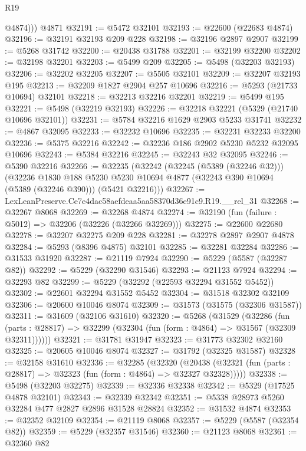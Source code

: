 \begin{lexlean}{R19}
\begin{coremodule}
          @4874)))
    @4871
@32191 := @5472 @32101
@32193 := @22600 (@22683 @4874)
@32196 := @32191 @32193 @209 @228
@32198 := @32196 @2897 @2907
@32199 := @5268 @31742
@32200 := @20438 @31788
@32201 := @32199 @32200
@32202 := @32198 @32201
@32203 := @5499 @209
@32205 := @5498 (@32203 @32193)
@32206 := @32202 @32205
@32207 := @5505 @32101
@32209 := @32207 @32193 @195
@32213 := @32209 @1827 @2904 @257 @10696
@32216 := @5293 (@21733 @10694) @32101
@32218 := @32213 @32216 @32201
@32219 := @5499 @195
@32221 := @5498 (@32219 @32193)
@32226 := @32218 @32221 (@5329 (@21740 @10696 @32101))
@32231 := @5784 @32216 @1629 @2903 @5233 @31741
@32232 := @4867 @32095
@32233 := @32232 @10696
@32235 := @32231 @32233 @32200
@32236 := @5375 @32216
@32242 := @32236 @186 @2902 @5230 @5232 @32095 @10696
@32243 := @5384 @32216
@32245 := @32243 @32 @32095
@32246 := @5390 @32216
@32266 := @32235
    (@32242
      (@32245 (@5389 (@32246 @32)))
      (@32236
        @1830
        @188
        @5230
        @5230
        @10694
        @4877
        (@32243 @390 @10694 (@5389 (@32246 @390)))
        (@5421 @32216)))
@32267 := LexLeanPreserve.Ce7e4dac58aefdeaa5aa58370d36e91c9.R19.__rel_31
@32268 := @32267 @8068
@32269 := @32268 @4874
@32274 := @32190 (fun (failure : @5012) => @32206 (@32226 (@32266 @32269)))
@32275 := @22600 @22680
@32278 := @32207 @32275 @209 @228
@32281 := @32278 @2897 @2907 @4878
@32284 := @5293 (@8396 @4875) @32101
@32285 := @32281 @32284
@32286 := @31533 @31920
@32287 := @21119 @7924
@32290 := @5229 (@5587 (@32287 @82))
@32292 := @5229 (@32290 @31546)
@32293 := @21123 @7924
@32294 := @32293 @82
@32299 := @5229 (@32292 (@22593 @32294 @31552 @5452))
@32302 := @22601 @32294 @31552 @5452
@32304 := @31518 @32302 @32109
@32306 := @20600 @10046 @8074
@32309 := @31573 (@31575 (@32306 @31587))
@32311 := @31609 (@32106 @31610)
@32320 := @5268
    (@31529
      (@32286
        (fun (parts : @28817) => @32299 (@32304 (fun (form : @4864) => @31567 (@32309 @32311))))))
@32321 := @31781 @31947
@32323 := @31773 @32302 @32160
@32325 := @20605 @10046 @8074
@32327 := @31792 (@32325 @31587)
@32328 := @32158 @31610
@32336 := @32285
    (@32320
      (@20438 (@32321 (fun (parts : @28817) => @32323 (fun (form : @4864) => @32327 @32328)))))
@32338 := @5498 (@32203 @32275)
@32339 := @32336 @32338
@32342 := @5329 (@17525 @4878 @32101)
@32343 := @32339 @32342
@32351 := @5338 @28973 @5260 @32284 @477 @2827 @2896 @31528 @28824
@32352 := @31532 @4874
@32353 := @32352 @32109
@32354 := @21119 @8068
@32357 := @5229 (@5587 (@32354 @82))
@32359 := @5229 (@32357 @31546)
@32360 := @21123 @8068
@32361 := @32360 @82

\end{coremodule}
\end{lexlean}
